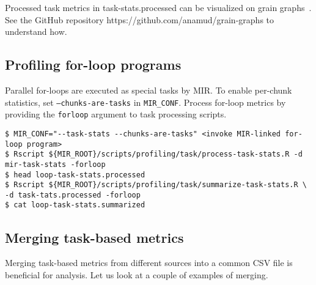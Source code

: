 \documentclass[11pt,a4paper]{article}
\begin{document}
Processed task metrics in \textsf{task-stats.processed} can be visualized on grain graphs~\cite{muddukrishna2015grain}. See the GitHub repository \textsf{https://github.com/anamud/grain-graphs} to understand how.

\subsection{Profiling for-loop programs}

Parallel for-loops are executed as special tasks by MIR. To enable per-chunk statistics, set \texttt{--chunks-are-tasks} in \texttt{MIR\_CONF}. Process for-loop metrics by providing the \texttt{forloop} argument to task processing scripts.

\begin{lstlisting}[style=MyInputStyle]
$ MIR_CONF="--task-stats --chunks-are-tasks" <invoke MIR-linked for-loop program>
$ Rscript ${MIR_ROOT}/scripts/profiling/task/process-task-stats.R -d mir-task-stats -forloop
$ head loop-task-stats.processed
$ Rscript ${MIR_ROOT}/scripts/profiling/task/summarize-task-stats.R \
-d task-tats.processed -forloop
$ cat loop-task-stats.summarized
\end{lstlisting}

\subsection{Merging task-based metrics}
\label{sub:merging_task_based_metrics}

Merging task-based metrics from different sources into a common CSV file is beneficial for analysis. Let us look at a couple of examples of merging.
\end{document}
